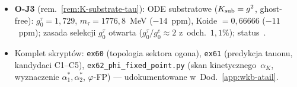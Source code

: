 \begin{remark}
\begin{enumerate}[nosep]
\begin{itemize}[nosep]
        $g_0^\mu = \varphi \cdot g_0^*$; $(A_\mu/A_e)^4 = 206{,}768$
        (dok\l{}adna zgodno\'s\'c z~PDG) potwierdzone we
        wszystkich trzech ODE (uproszcz., pe\l{}ne, substrat.);
        status~.
      \item \textbf{O-J3} (rem.~\ref{rem:K-substrate-tau}):
        ODE substratowe ($K_{\rm sub} = g^2$, ghost-free):
        $g_0^\tau = 1{,}729$, $m_\tau = 1776{,}8$~MeV ($-14$~ppm),
        Koide $= 0{,}66666$ ($-11$~ppm);
        zasada selekcji $g_0^\tau$ otwarta ($g_0^\tau/g_0^e \approx 2$
        z~odch.\ $1{,}1\%$); status~.
      \item Komplet skrypt\'ow: \texttt{ex60} (topologia sektora ogona),
        \texttt{ex61} (predykcja tauonu, kandydaci C1--C5),
        \texttt{ex62\_phi\_fixed\_point.py} (skan kinetycznego~$\alpha_K$,
        wyznaczenie $\alpha_1^*, \alpha_2^*$, $\varphi$-FP)
        --- udokumentowane w~Dod.~\ref{app:wkb-atail}.
    \end{itemize}


\end{enumerate}
\end{remark}
